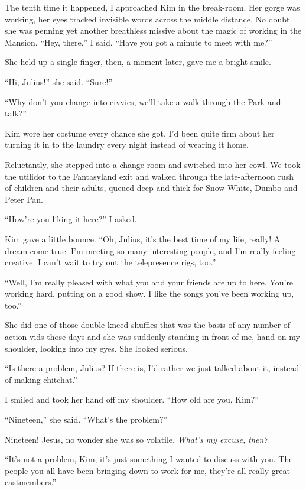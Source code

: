 The tenth time it happened, I approached Kim in the break-room. Her
gorge was working, her eyes tracked invisible words across the
middle distance. No doubt she was penning yet another breathless
missive about the magic of working in the Mansion. “Hey, there,” I
said. “Have you got a minute to meet with me?”

She held up a single finger, then, a moment later, gave me a bright
smile.

“Hi, Julius!” she said. “Sure!”

“Why don't you change into civvies, we'll take a walk through the
Park and talk?”

Kim wore her costume every chance she got. I'd been quite firm
about her turning it in to the laundry every night instead of
wearing it home.

Reluctantly, she stepped into a change-room and switched into her
cowl. We took the utilidor to the Fantasyland exit and walked
through the late-afternoon rush of children and their adults,
queued deep and thick for Snow White, Dumbo and Peter Pan.

“How're you liking it here?” I asked.

Kim gave a little bounce. “Oh, Julius, it's the best time of my
life, really! A dream come true. I'm meeting so many interesting
people, and I'm really feeling creative. I can't wait to try out
the telepresence rigs, too.”

“Well, I'm really pleased with what you and your friends are up to
here. You're working hard, putting on a good show. I like the songs
you've been working up, too.”

She did one of those double-kneed shuffles that was the basis of
any number of action vids those days and she was suddenly standing
in front of me, hand on my shoulder, looking into my eyes. She
looked serious.

“Is there a problem, Julius? If there is, I'd rather we just talked
about it, instead of making chitchat.”

I smiled and took her hand off my shoulder. “How old are you,
Kim?”

“Nineteen,” she said. “What's the problem?”

Nineteen! Jesus, no wonder she was so volatile.
\emph{What's my excuse, then?}

“It's not a problem, Kim, it's just something I wanted to discuss
with you. The people you-all have been bringing down to work for
me, they're all really great castmembers.”

